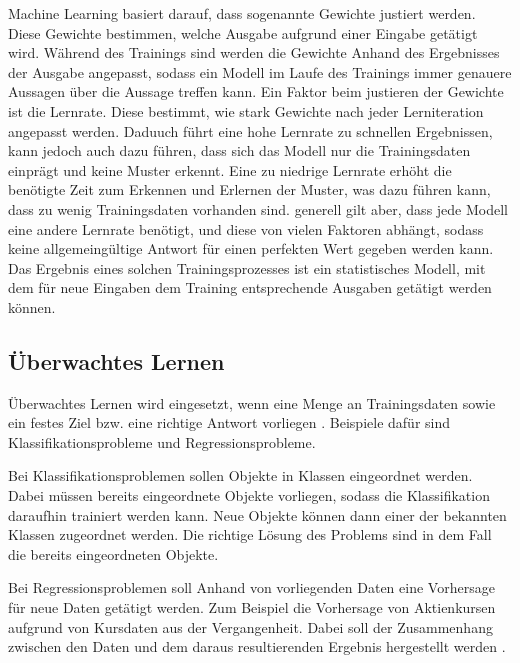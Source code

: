 Machine Learning basiert darauf, dass sogenannte Gewichte justiert werden. Diese Gewichte bestimmen, welche Ausgabe aufgrund einer Eingabe getätigt wird. Während des Trainings sind werden die Gewichte Anhand des Ergebnisses der Ausgabe angepasst, sodass ein Modell im Laufe des Trainings immer genauere Aussagen über die Aussage treffen kann. Ein Faktor beim justieren der Gewichte ist die Lernrate. Diese bestimmt, wie stark Gewichte nach jeder Lerniteration angepasst werden. Daduuch führt eine hohe Lernrate zu schnellen Ergebnissen, kann jedoch auch dazu führen, dass sich das Modell nur die Trainingsdaten einprägt und keine Muster erkennt. Eine zu niedrige Lernrate erhöht die benötigte Zeit zum Erkennen und Erlernen der Muster, was dazu führen kann, dass zu wenig Trainingsdaten vorhanden sind. generell gilt aber, dass jede Modell eine andere Lernrate benötigt, und diese von vielen Faktoren abhängt, sodass keine allgemeingültige Antwort für einen perfekten Wert gegeben werden kann. Das Ergebnis eines solchen Trainingsprozesses ist ein statistisches Modell, mit dem für neue Eingaben dem Training entsprechende Ausgaben getätigt werden können.

\subsection{Überwachtes Lernen}
\label{subsec:ueberwachtesLernen}
Überwachtes Lernen wird eingesetzt, wenn eine Menge an Trainingsdaten sowie ein festes Ziel bzw. eine richtige Antwort vorliegen \cite[vgl.][]{ueberwachtMaschLernen}. Beispiele dafür sind Klassifikationsprobleme und Regressionsprobleme.

Bei Klassifikationsproblemen sollen Objekte in Klassen eingeordnet werden. Dabei müssen bereits eingeordnete Objekte vorliegen, sodass die Klassifikation daraufhin trainiert werden kann. Neue Objekte können dann einer der bekannten Klassen zugeordnet werden. Die richtige Lösung des Problems sind in dem Fall die bereits eingeordneten Objekte.

Bei Regressionsproblemen soll Anhand von vorliegenden Daten eine Vorhersage für neue Daten getätigt werden. Zum Beispiel die Vorhersage von Aktienkursen aufgrund von Kursdaten aus der Vergangenheit. Dabei soll der Zusammenhang zwischen den Daten und dem daraus resultierenden Ergebnis hergestellt werden \cite[vgl.][]{RegKlass}.

